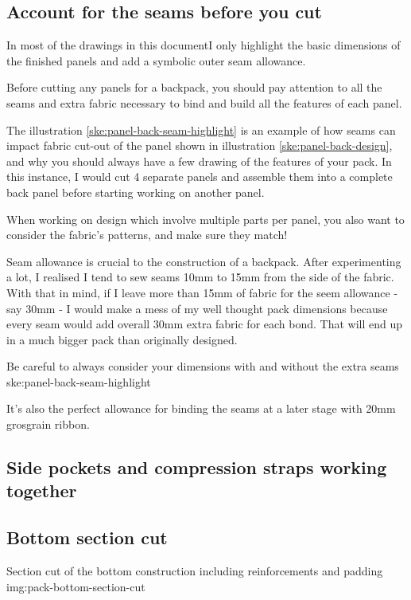 \subsection{Account for the seams before you cut}\label{sec:seams-and-cutouts}

In most of the drawings in this documentI only highlight the basic dimensions of the finished panels and add a symbolic outer seam allowance.

Before cutting any panels for a backpack, you should pay attention to all the seams and extra fabric necessary to bind and build all the features of each panel.

The illustration \ref{ske:panel-back-seam-highlight} is an example of how seams can impact fabric cut-out of the panel shown in illustration \ref{ske:panel-back-design}, and why you should always have a few drawing of the features of your pack. In this instance, I would cut 4 separate panels and assemble them into a complete back panel before starting working on another panel.

\begin{note}
  When working on design which involve multiple parts per panel, you also want to consider the fabric's patterns, and make sure they match!
\end{note}

Seam allowance is crucial to the construction of a backpack. After experimenting a lot, I realised I tend to sew seams 10mm to 15mm from the side of the fabric. With that in mind, if I leave more than 15mm of fabric for the seem allowance - say 30mm - I would make a mess of my well thought pack dimensions because every seam would add overall 30mm extra fabric for each bond. That will end up in a much bigger pack than originally designed.

{Be careful to always consider your dimensions with and without the extra seams}
{ske:panel-back-seam-highlight}

\begin{note}
  It's also the perfect allowance for binding the seams at a later stage with 20mm grosgrain ribbon.
\end{note}

\subsection{Side pockets and compression straps working together}\label{sec:construction-side-pockets}

\subsection{Bottom section cut}

{Section cut of the bottom construction including reinforcements and padding}
{img:pack-bottom-section-cut}
